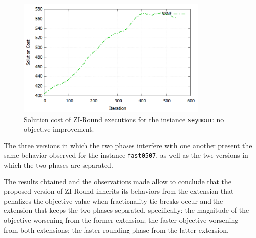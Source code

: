 \documentclass[a4paper,12pt]{book}
\begin{document}
\begin{figure}[h!]
	\centering
	\includegraphics[width=0.83\textwidth]{seymour-solcost-nsnf.png}
	\caption{Solution cost of ZI-Round executions for the instance \texttt{seymour}: no objective improvement.}
	\label{fig:seymour-solcost-nsnf}
\end{figure}

The three versions in which the two phases interfere with one another present the same behavior observed for the instance \texttt{fast0507}, as well as the two versions in which the two phases are separated. \par 

The results obtained and the observations made allow to conclude that the proposed version of ZI-Round inherits its behaviors from the extension that penalizes the objective value when fractionality tie-breaks occur and the extension that keeps the two phases separated, specifically: the magnitude of the objective worsening from the former extension; the faster objective worsening from both extensions; the faster rounding phase from the latter extension.



\end{document}

